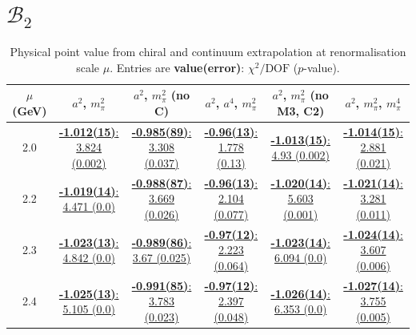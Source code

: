 \documentclass[12pt]{extarticle}
\begin{document}
\section{$\mathcal{B}_2$}
\begin{table}[h!]
\begin{center}
\begin{tabular}{|c|c|c|c|c|c|}
\hline
$\mu$ (GeV) & $a^2$, $m_\pi^2$& $a^2$, $m_\pi^2$ (no C)& $a^2$, $a^4$, $m_\pi^2$& $a^2$, $m_\pi^2$ (no M3, C2)& $a^2$, $m_\pi^2$, $m_\pi^4$\\
\hline
2.0& \hyperlink{VVmAA/NPR/a2m2_20.pdf.1}{\textbf{-1.012(15)}: 3.824 (0.002)} & \hyperlink{VVmAA/NPR/a2m2noC_20.pdf.1}{\textbf{-0.985(89)}: 3.308 (0.037)} & \hyperlink{VVmAA/NPR/a2a4m2_20.pdf.1}{\textbf{-0.96(13)}: 1.778 (0.13)} & \hyperlink{VVmAA/NPR/a2m2mcut_20.pdf.1}{\textbf{-1.013(15)}: 4.93 (0.002)} & \hyperlink{VVmAA/NPR/a2m2m4_20.pdf.1}{\textbf{-1.014(15)}: 2.881 (0.021)}\\
2.2& \hyperlink{VVmAA/NPR/a2m2_22.pdf.1}{\textbf{-1.019(14)}: 4.471 (0.0)} & \hyperlink{VVmAA/NPR/a2m2noC_22.pdf.1}{\textbf{-0.988(87)}: 3.669 (0.026)} & \hyperlink{VVmAA/NPR/a2a4m2_22.pdf.1}{\textbf{-0.96(13)}: 2.104 (0.077)} & \hyperlink{VVmAA/NPR/a2m2mcut_22.pdf.1}{\textbf{-1.020(14)}: 5.603 (0.001)} & \hyperlink{VVmAA/NPR/a2m2m4_22.pdf.1}{\textbf{-1.021(14)}: 3.281 (0.011)}\\
2.3& \hyperlink{VVmAA/NPR/a2m2_23.pdf.1}{\textbf{-1.023(13)}: 4.842 (0.0)} & \hyperlink{VVmAA/NPR/a2m2noC_23.pdf.1}{\textbf{-0.989(86)}: 3.67 (0.025)} & \hyperlink{VVmAA/NPR/a2a4m2_23.pdf.1}{\textbf{-0.97(12)}: 2.223 (0.064)} & \hyperlink{VVmAA/NPR/a2m2mcut_23.pdf.1}{\textbf{-1.023(14)}: 6.094 (0.0)} & \hyperlink{VVmAA/NPR/a2m2m4_23.pdf.1}{\textbf{-1.024(14)}: 3.607 (0.006)}\\
2.4& \hyperlink{VVmAA/NPR/a2m2_24.pdf.1}{\textbf{-1.025(13)}: 5.105 (0.0)} & \hyperlink{VVmAA/NPR/a2m2noC_24.pdf.1}{\textbf{-0.991(85)}: 3.783 (0.023)} & \hyperlink{VVmAA/NPR/a2a4m2_24.pdf.1}{\textbf{-0.97(12)}: 2.397 (0.048)} & \hyperlink{VVmAA/NPR/a2m2mcut_24.pdf.1}{\textbf{-1.026(14)}: 6.353 (0.0)} & \hyperlink{VVmAA/NPR/a2m2m4_24.pdf.1}{\textbf{-1.027(14)}: 3.755 (0.005)}\\
\hline
\end{tabular}
\caption{Physical point value from chiral and continuum extrapolation at renormalisation scale $\mu$. Entries are \textbf{value(error)}: $\chi^2/\text{DOF}$ ($p$-value).}
\end{center}
\end{table}
\end{document}
